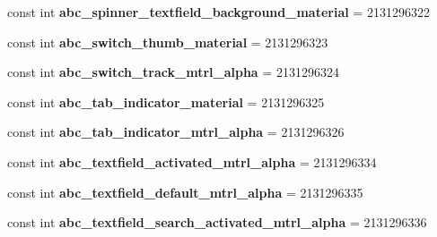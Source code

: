 \begin{DoxyCompactItemize}
\item 
\mbox{\label{classst_delivery_1_1_resource_1_1_drawable_a92815bc43bb99893b2efb7e6836c1bd0}} 
const int {\bfseries abc\+\_\+spinner\+\_\+textfield\+\_\+background\+\_\+material} = 2131296322
\item 
\mbox{\label{classst_delivery_1_1_resource_1_1_drawable_afdc6a6c4833a25a5c14d77ccf4c9528e}} 
const int {\bfseries abc\+\_\+switch\+\_\+thumb\+\_\+material} = 2131296323
\item 
\mbox{\label{classst_delivery_1_1_resource_1_1_drawable_a4d7e9816278da07aac12ce35172dd035}} 
const int {\bfseries abc\+\_\+switch\+\_\+track\+\_\+mtrl\+\_\+alpha} = 2131296324
\item 
\mbox{\label{classst_delivery_1_1_resource_1_1_drawable_afc6a5e9b0c31a2a9ef4831319e6314a6}} 
const int {\bfseries abc\+\_\+tab\+\_\+indicator\+\_\+material} = 2131296325
\item 
\mbox{\label{classst_delivery_1_1_resource_1_1_drawable_a4987dc8de4cb25c1d3b11deaa67106ea}} 
const int {\bfseries abc\+\_\+tab\+\_\+indicator\+\_\+mtrl\+\_\+alpha} = 2131296326
\item 
\mbox{\label{classst_delivery_1_1_resource_1_1_drawable_ae0b2830a80bf2c1f5ad755cae7cdd02c}} 
const int {\bfseries abc\+\_\+textfield\+\_\+activated\+\_\+mtrl\+\_\+alpha} = 2131296334
\item 
\mbox{\label{classst_delivery_1_1_resource_1_1_drawable_a85c9c221e433407b60a89ebf30cd75ca}} 
const int {\bfseries abc\+\_\+textfield\+\_\+default\+\_\+mtrl\+\_\+alpha} = 2131296335
\item 
\mbox{\label{classst_delivery_1_1_resource_1_1_drawable_a45cd28994cc38b83a58a0acc6d6bb722}} 
const int {\bfseries abc\+\_\+textfield\+\_\+search\+\_\+activated\+\_\+mtrl\+\_\+alpha} = 2131296336
\item 
\mbox{\label{classst_delivery_1_1_resource_1_1_drawable_ae8f8046932b86fed3e471c5486fd088c}} 

\end{DoxyCompactItemize}
